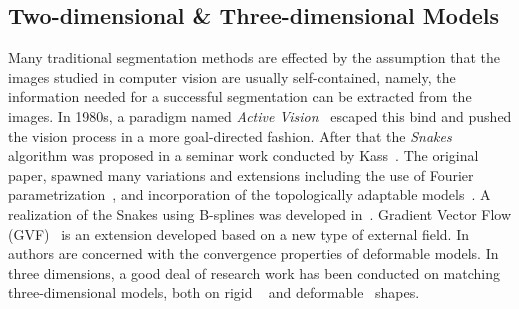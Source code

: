 \documentclass[conference]{IEEEtran}
\begin{document}
\subsection{Two-dimensional \& Three-dimensional Models}
\label{sec:23m}
Many traditional segmentation methods are effected by the assumption that the
images studied in computer vision are usually self-contained, namely,
the information needed for a successful segmentation can be extracted
from the images. In 1980s, a paradigm named \textit{Active Vision}~\cite{aloimonos1988active} 
escaped this bind and pushed the vision process in a more goal-directed fashion. 
After that the \textit{Snakes} algorithm was proposed in a seminar work conducted 
by Kass~\cite{kass1988snakes}. The original paper, spawned many variations
and extensions including the use of Fourier parametrization~\cite{scott1987alternative}, 
and incorporation of the topologically adaptable models~\cite{mcinerney1995topologically}.
A realization of the Snakes using B-splines was developed in~\cite{brigger2000b}. 
Gradient Vector Flow (GVF)~\cite{xu1998snakes} is an extension developed
based on a new type of external field. In~\cite{xu2000gradient}
authors are concerned with the convergence properties of deformable
models. In three dimensions, a good deal of research work has been
conducted on matching three-dimensional models, both on rigid
~\cite{harris1993tracking} and deformable~\cite{terzopoulos1991dynamic} shapes.
\end{document}

